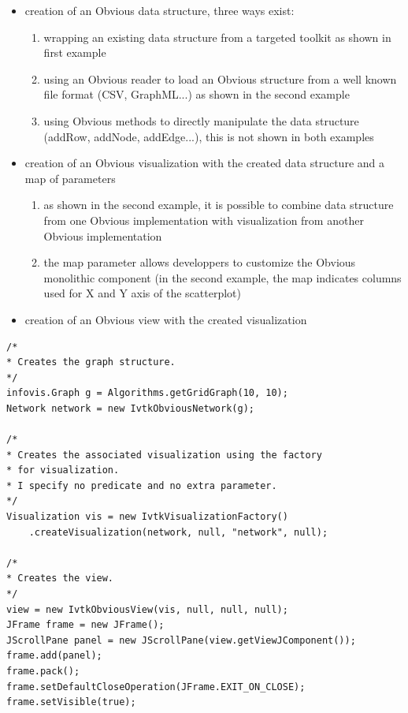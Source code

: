 \begin{itemize}
 \item creation of an Obvious data structure, three ways exist:
 \begin{enumerate}
  \item wrapping an existing data structure from a targeted toolkit as shown in first example
  \item using an Obvious reader to load an Obvious structure from a well known file format (CSV, GraphML...) as shown in the second example
  \item using Obvious methods to directly manipulate the data structure (addRow, addNode, addEdge...), this is not shown in both examples 
 \end{enumerate}
 \item creation of an Obvious visualization with the created data structure and a map of parameters
 \begin{enumerate}
  \item as shown in the second example, it is possible to combine data structure from one Obvious implementation with visualization from another Obvious implementation
  \item the map parameter allows developpers to customize the Obvious monolithic component (in the second example, the map indicates columns used for X and Y axis of the scatterplot)
 \end{enumerate}
 \item creation of an Obvious view with the created visualization
\end{itemize} 

\begin{lstlisting}
/*
* Creates the graph structure.
*/
infovis.Graph g = Algorithms.getGridGraph(10, 10);
Network network = new IvtkObviousNetwork(g);

/*
* Creates the associated visualization using the factory
* for visualization.
* I specify no predicate and no extra parameter.
*/
Visualization vis = new IvtkVisualizationFactory()
    .createVisualization(network, null, "network", null);

/*
* Creates the view.
*/
view = new IvtkObviousView(vis, null, null, null);
JFrame frame = new JFrame();
JScrollPane panel = new JScrollPane(view.getViewJComponent());
frame.add(panel);
frame.pack();
frame.setDefaultCloseOperation(JFrame.EXIT_ON_CLOSE);
frame.setVisible(true);
\end{lstlisting}

